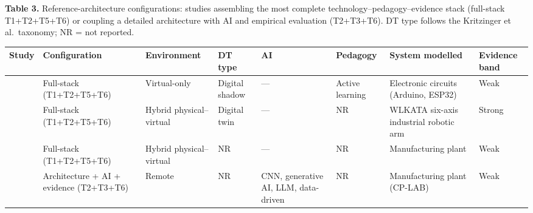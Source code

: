 \textbf{Table 3.} Reference-architecture configurations: studies assembling the most
complete technology--pedagogy--evidence stack (full-stack T1+T2+T5+T6) or coupling a
detailed architecture with AI and empirical evaluation (T2+T3+T6). DT type follows
the Kritzinger et al.~taxonomy; NR = not reported.

{\def\LTcaptype{none} %
\begin{longtable}[]{@{}
  >{\raggedright\arraybackslash}p{}
  >{\raggedright\arraybackslash}p{}
  >{\raggedright\arraybackslash}p{}
  >{\raggedright\arraybackslash}p{}
  >{\raggedright\arraybackslash}p{}
  >{\raggedright\arraybackslash}p{}
  >{\raggedright\arraybackslash}p{}
  >{\raggedright\arraybackslash}p{}@{}}
\toprule\noalign{}
\begin{minipage}[b]{\linewidth}\raggedright
Study
\end{minipage} & \begin{minipage}[b]{\linewidth}\raggedright
Configuration
\end{minipage} & \begin{minipage}[b]{\linewidth}\raggedright
Environment
\end{minipage} & \begin{minipage}[b]{\linewidth}\raggedright
DT type
\end{minipage} & \begin{minipage}[b]{\linewidth}\raggedright
AI
\end{minipage} & \begin{minipage}[b]{\linewidth}\raggedright
Pedagogy
\end{minipage} & \begin{minipage}[b]{\linewidth}\raggedright
System modelled
\end{minipage} & \begin{minipage}[b]{\linewidth}\raggedright
Evidence band
\end{minipage} \\
\midrule\noalign{}
\endhead
\bottomrule\noalign{}
\endlastfoot
\citep{sakkas_multiplayer_2025} & Full-stack (T1+T2+T5+T6) & Virtual-only & Digital shadow & --- & Active learning & Electronic circuits (Arduino, ESP32) & Weak \\
\citep{tarng_application_2024} & Full-stack (T1+T2+T5+T6) & Hybrid physical--virtual & Digital twin & --- & NR & WLKATA six-axis industrial robotic arm & Strong \\
\citep{terkaj_framework_2024} & Full-stack (T1+T2+T5+T6) & Hybrid physical--virtual & NR & --- & NR & Manufacturing plant & Weak \\
\citep{machado_automatic_2025} & Architecture + AI + evidence (T2+T3+T6) & Remote & NR & CNN, generative AI, LLM, data-driven & NR & Manufacturing plant (CP-LAB) & Weak \\
\end{longtable}
}

